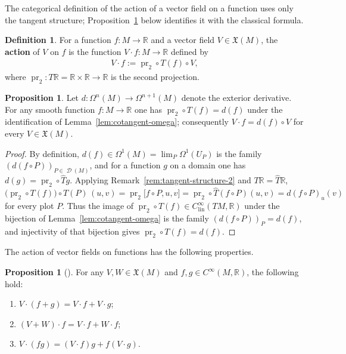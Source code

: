 \documentclass{amsart}
\newcommand{\R}{\mathbb{R}}
\newcommand{\Clin}{C^{\infty}_{\mathrm{lin}}}
\DeclareMathOperator{\D}{\mathcal{D}}
\DeclareMathOperator{\pr}{pr}
\theoremstyle{definition}
\newtheorem{defn}[thm]{Definition}
\newtheorem{prop}[thm]{Proposition}
\begin{document}
The categorical definition of the action of a vector field on a function uses
only the tangent structure; Proposition~\ref{prop:pr2-Tf} below identifies it
with the classical formula.

\begin{defn}\label{def:vf-action}
For a function $f \colon M \to \R$ and a vector field $V \in \mathfrak{X}(M)$,
the \textbf{action} of $V$ on $f$ is the function $V \cdot f \colon M \to \R$
defined by
\begin{align*}
    V \cdot f := \pr_2 \circ T(f) \circ V ,
\end{align*}
where $\pr_2 \colon T\R = \R \times \R \to \R$ is the second projection.
\end{defn}

\begin{prop}\label{prop:pr2-Tf}
  Let $d \colon \Omega^n(M) \to \Omega^{n+1}(M)$ denote the exterior derivative.
  For any smooth function $f \colon M \to \R$ one has
  $\pr_2 \circ T(f) = d(f)$
  under the identification of Lemma~\ref{lem:cotangent-omega}; consequently
  $V \cdot f = d(f) \circ V$ for every $V \in \mathfrak{X}(M)$.
\end{prop}

\begin{proof}
  By definition, $d(f) \in \Omega^1(M) = \lim_P \Omega^1(U_P)$ is the family
  $(d(f \circ P))_{P \in \D(M)}$, and for a function $g$ on a domain one has
  $d(g) = \pr_2 \circ \hat{T}g$. Applying
  Remark~\ref{rem:tangent-structure-2} and $T\R = \hat{T}\R$,
  \begin{equation*}
    \bigl(\pr_2 \circ T(f)\bigr)\circ T(P)\,(u,v)
      = \pr_2\bigl[f \circ P, u, v\bigr]
      = \pr_2 \circ \hat{T}(f \circ P)(u,v)
      = d(f \circ P)_u(v)
  \end{equation*}
  for every plot $P$. Thus the image of $\pr_2 \circ T(f) \in \Clin(TM,\R)$
  under the bijection of Lemma~\ref{lem:cotangent-omega} is the family
  $(d(f\circ P))_P = d(f)$, and injectivity of that bijection gives
  $\pr_2 \circ T(f) = d(f)$.
\end{proof}

The action of vector fields on functions has the following properties.

\begin{prop}[{\cite[Proposition~2.25]{AB}}]\label{prop:vf-action-properties}
  For any $V, W \in \mathfrak{X}(M)$ and $f, g \in C^\infty(M, \R)$,
  the following hold:
  \begin{enumerate}
    \item $V \cdot (f + g) = V \cdot f + V \cdot g$;
    \item $(V + W) \cdot f = V \cdot f + W \cdot f$;
    \item $V \cdot (fg) = (V \cdot f)g + f(V \cdot g)$.
  \end{enumerate}
\end{prop}
\end{document}
